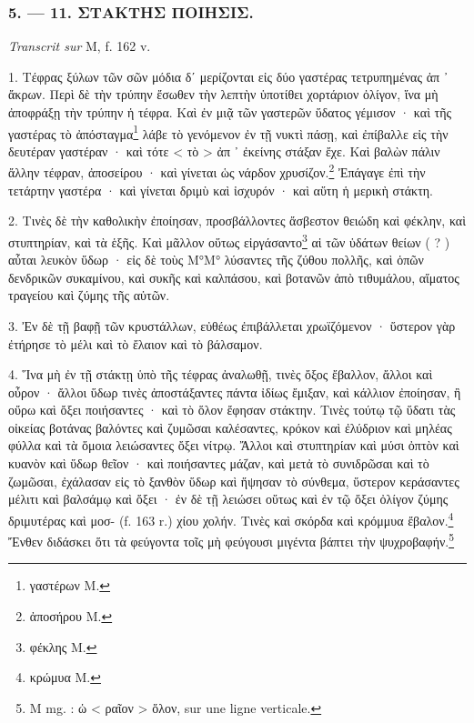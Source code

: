 \documentclass[a4paper, 11pt, oneside, polutonikogreek, french]{article}
\begin{document}
\bigskip
\centerline{\EightStarTaper}
\centerline{\EightStarTaper\EightStarTaper}
\bigskip

\subsubsection{5. --- 11. ΣΤΑΚΤΗΣ ΠΟΙΗΣΙΣ.}

\emph{Transcrit sur} M, f. 162 v.

1. Τέφρας ξύλων τῶν σῶν μόδια δʹ μερίζονται εἰς δύο γαστέρας τετρυπημένας ἀπ ᾽ ἄκρων. Περὶ δὲ τὴν τρύπην ἔσωθεν τὴν λεπτὴν ὑποτίθει χορτάριον ὀλίγον, ἵνα μὴ ἀποφράξῃ τὴν τρύπην ἡ τέφρα. Καὶ ἐν μιᾷ τῶν γαστερῶν ὕδατος γέμισον · καὶ τῆς γαστέρας τὸ ἀπόσταγμα\footnote{γαστέρων M.} λάβε τὸ γενόμενον ἐν τῇ νυκτὶ πάσῃ, καὶ ἐπίβαλλε εἰς τὴν δευτέραν γαστέραν · καὶ τότε < τὸ > ἀπ ᾽ ἐκείνης στάξαν ἔχε. Καὶ βαλὼν πάλιν ἄλλην τέφραν, ἀποσείρου · καὶ γίνεται ὡς νάρδον χρυσίζον.\footnote{ἀποσήρου M.} Ἐπάγαγε ἐπὶ τὴν τετάρτην γαστέρα · καὶ γίνεται δριμὺ καὶ ἰσχυρόν · καὶ αὕτη ἡ μερικὴ στάκτη.

2. Τινὲς δὲ τὴν καθολικὴν ἐποίησαν, προσβάλλοντες ἄσβεστον θειώδη καὶ φέκλην, καὶ στυπτηρίαν, καὶ τὰ ἑξῆς. Καὶ μᾶλλον οὕτως εἰργάσαντο\footnote{φέκλης M.} αἱ τῶν ὑδάτων θείων ( ? ) αὗται λευκὸν ὕδωρ · εἰς δὲ τοὺς Μ°Μ° λύσαντες τῆς ζύθου πολλῆς, καὶ ὁπῶν δενδρικῶν συκαμίνου, καὶ συκῆς καὶ καλπάσου, καὶ βοτανῶν ἀπὸ τιθυμάλου, αἵματος τραγείου καὶ ζύμης τῆς αὐτῶν.

3. Ἐν δὲ τῇ βαφῇ τῶν κρυστάλλων, εὐθέως ἐπιβάλλεται χρωϊζόμενον · ὕστερον γὰρ ἐτήρησε τὸ μέλι καὶ τὸ ἔλαιον καὶ τὸ βάλσαμον.

4. Ἵνα μὴ ἐν τῇ στάκτῃ ὑπὸ τῆς τέφρας ἀναλωθῇ, τινὲς ὄξος ἔβαλλον, ἄλλοι καὶ οὖρον · ἄλλοι ὕδωρ τινὲς ἀποστάξαντες πάντα ἰδίως ἔμιξαν, καὶ κάλλιον ἐποίησαν, ἢ οὔρω καὶ ὄξει ποιήσαντες · καὶ τὸ ὅλον ἔφησαν στάκτην. Τινὲς τούτῳ τῷ ὕδατι τὰς οἰκείας βοτάνας βαλόντες καὶ ζυμῶσαι καλέσαντες, κρόκον καὶ ἐλύδριον καὶ μηλέας φύλλα καὶ τὰ ὅμοια λειώσαντες ὄξει νίτρῳ. Ἄλλοι καὶ στυπτηρίαν καὶ μύσι ὀπτὸν καὶ κυανὸν καὶ ὕδωρ θεῖον · καὶ ποιήσαντες μάζαν, καὶ μετἀ τὸ συνιδρῶσαι καὶ τὸ ζωμῶσαι, ἐχάλασαν εἰς τὸ ξανθὸν ὕδωρ καὶ ἥψησαν τὸ σύνθεμα, ὕστερον κεράσαντες μέλιτι καὶ βαλσάμῳ καὶ ὄξει · ἐν δὲ τῇ λειώσει οὕτως καὶ ἐν τῷ ὄξει ὀλίγον ζύμης δριμυτέρας καὶ μοσ- (f. 163 r.) χίου χολήν. Τινὲς καὶ σκόρδα καὶ κρόμμυα ἔβαλον.\footnote{κρώμυα M.} Ἔνθεν διδάσκει ὅτι τὰ φεύγοντα τοῖς μὴ φεύγουσι μιγέντα βάπτει τὴν ψυχροβαφήν.\footnote{M mg. : ὡ < ραῖον > ὅλον, sur une ligne verticale.}

\bigskip
\centerline{\EightStarTaper}
\centerline{\EightStarTaper\EightStarTaper}
\bigskip
\end{document}
